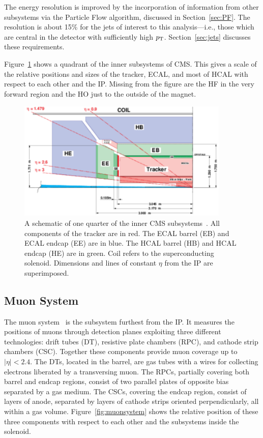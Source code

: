 The energy resolution is improved by the incorporation of information from other subsystems via
the Particle Flow algorithm, discussed in Section~\ref{sec:PF}.
The resolution is about 15\% for the jets of interest to this analysis---i.e., those which are central 
in the detector with
sufficiently high $p_{\rm T}$. Section~\ref{sec:jets} discusses these requirements.

Figure~\ref{fig:subsystems_inner} shows a quadrant of the inner subsystems of CMS. This gives
a scale of the relative positions and sizes of the tracker, ECAL,
and most of HCAL with respect to each other and the IP. Missing from the figure are the HF
in the very forward region and the HO just to the outside of
the magnet.

\begin{figure}[htbp!]
 \begin{center}
   \includegraphics[width=0.90\textwidth]{figures/experiment/subsystems_inner.pdf}
      \end{center}
\caption{A schematic of one quarter of the inner CMS subsystems~\cite{ecaltdr}.
All components of the tracker are in red. The ECAL barrel (EB) and ECAL endcap (EE) are in blue.
The HCAL barrel (HB) and HCAL endcap (HE) are in green. Coil refers to the superconducting solenoid.
Dimensions and lines of constant $\eta$ from the IP are superimposed.}
\label{fig:subsystems_inner}
\end{figure}


\subsection{Muon System\label{subsec:muonsystem}}

The muon system~\cite{muontdr} is the subsystem furthest from the IP. It measures the positions
of muons through detection planes exploiting three different technologies:
drift tubes (DT), resistive plate chambers (RPC), and cathode strip chambers (CSC).
Together these components provide muon coverage up to $|\eta|< 2.4$.
The DTs, located in the barrel, are gas tubes with a wires for collecting electrons liberated
by a transversing muon. The RPCs, partially covering both barrel and endcap regions, consist
of two parallel plates of opposite bias separated by a gas medium. The CSCs, covering the endcap region,
consist of layers of anode, separated by layers of cathode strips oriented perpendicularly, all
within a gas volume. Figure~\ref{fig:muonsystem} shows the relative position of these three components with respect to each other and the subsystems inside the solenoid.

